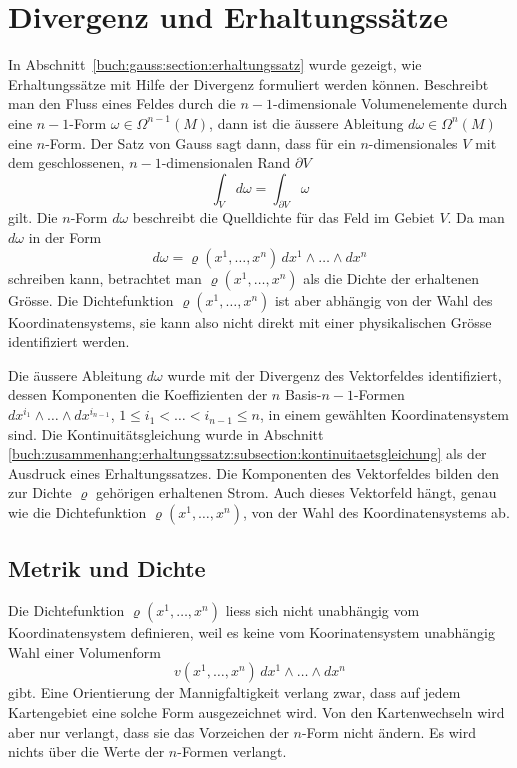 \section{Divergenz und Erhaltungssätze
\label{buch:zusammenhang:section:divergenz}}
In Abschnitt~\ref{buch:gauss:section:erhaltungssatz} wurde gezeigt,
wie Erhaltungssätze mit Hilfe der Divergenz formuliert werden können.
Beschreibt man den Fluss eines Feldes durch die $n-1$-dimensionale
Volumenelemente durch eine $n-1$-Form $\omega\in \Omega^{n-1}(M)$,
dann ist die äussere Ableitung $d\omega\in \Omega^n(M)$ eine $n$-Form.
Der Satz von Gauss sagt dann, dass für ein $n$-dimensionales $V$
mit dem geschlossenen, $n-1$-dimensionalen Rand $\partial V$
\[
\int_{V}d\omega
=
\int_{\partial V}\omega
\]
gilt.
Die $n$-Form $d\omega$ beschreibt die Quelldichte für das Feld im
Gebiet $V$.
Da man $d\omega$ in der Form
\[
d\omega
=
\varrho(x^1,\dots,x^n)
\,
dx^1\wedge\dots\wedge dx^n
\]
schreiben kann, betrachtet man $\varrho(x^1,\dots,x^n)$ als die
Dichte der erhaltenen Grösse.
Die Dichtefunktion $\varrho(x^1,\dots,x^n)$  ist aber abhängig
von der Wahl des Koordinatensystems, sie kann also nicht direkt 
mit einer physikalischen Grösse identifiziert werden.

Die äussere Ableitung $d\omega$ wurde mit der Divergenz des Vektorfeldes
identifiziert, dessen Komponenten die Koeffizienten der $n$ Basis-$n-1$-Formen
$dx^{i_1}\wedge\dots\wedge dx^{i_{n-1}}$, $1\le i_1<\dots<i_{n-1}\le n$, in
einem gewählten Koordinatensystem sind.
Die Kontinuitätsgleichung wurde in Abschnitt
\ref{buch:zusammenhang:erhaltungssatz:subsection:kontinuitaetsgleichung}
als der Ausdruck eines Erhaltungssatzes.
Die Komponenten des Vektorfeldes bilden den zur Dichte $\varrho$ gehörigen
erhaltenen Strom.
Auch dieses Vektorfeld hängt, genau wie die Dichtefunktion
$\varrho(x^1,\dots,x^n)$, von der Wahl des Koordinatensystems ab.

%
%
\subsection{Metrik und Dichte
\label{buch:zusammenhang:divergenz:subsection:metrik}}
Die Dichtefunktion $\varrho(x^1,\dots,x^n)$ liess sich nicht 
unabhängig vom Koordinatensystem definieren, weil es keine vom
Koorinatensystem unabhängig Wahl einer Volumenform
\[
v(x^1,\dots,x^n)\,dx^1\wedge\dots\wedge dx^n
\]
gibt.
Eine Orientierung der Mannigfaltigkeit verlang zwar, dass auf
jedem Kartengebiet eine solche Form ausgezeichnet wird.
Von den Kartenwechseln wird aber nur verlangt, dass sie das Vorzeichen
der $n$-Form nicht ändern.
Es wird nichts über die Werte der $n$-Formen verlangt.

